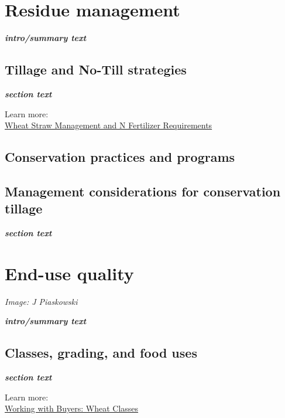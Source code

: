 \documentclass[
  letterpaper,
  DIV=11,
  numbers=noendperiod]{scrreprt}
\begin{document}

\chapter{Residue management}\label{residue-management}

\textbf{\emph{intro/summary text}}

\section{Tillage and No-Till
strategies}\label{tillage-and-no-till-strategies}

\textbf{\emph{section text}}

Learn more:\\
\href{https://objects.lib.uidaho.edu/uiext/uiext30049.pdf}{Wheat Straw
Management and N Fertilizer Requirements}

\section{Conservation practices and
programs}\label{conservation-practices-and-programs}

\section{Management considerations for conservation
tillage}\label{sec-management-considerations-for-conservation-tillage-systems}

\textbf{\emph{section text}}


\chapter{End-use quality}\label{end-use-quality}

\emph{Image: J Piaskowski}

\textbf{\emph{intro/summary text}}

\section{Classes, grading, and food
uses}\label{classes-grading-and-food-uses}

\textbf{\emph{section text}}

Learn more:\\
\href{https://www.uswheat.org/working-with-buyers/wheat-classes/}{Working
with Buyers: Wheat Classes}
\end{document}
